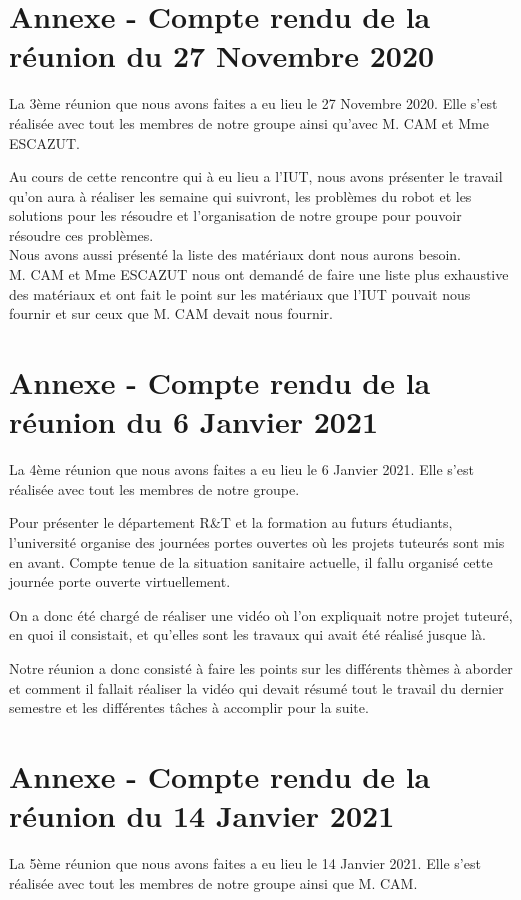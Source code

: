\documentclass{PackagerQualityN}
\begin{document}
\newp
\section*{Annexe - Compte rendu de la réunion du 27 Novembre 2020}
La 3ème réunion que nous avons faites a eu lieu le 27 Novembre 2020. Elle s'est réalisée avec tout les membres de notre groupe ainsi qu'avec M. CAM et Mme ESCAZUT.

Au cours de cette rencontre qui à eu lieu a l'IUT, nous avons présenter le travail qu'on aura à réaliser les semaine qui suivront, les problèmes du robot et les solutions pour les résoudre et l'organisation de notre groupe pour pouvoir résoudre ces problèmes.
\\

Nous avons aussi présenté la liste des matériaux dont nous aurons besoin.
\\

M. CAM et Mme ESCAZUT nous ont demandé de faire une liste plus exhaustive des matériaux et ont fait le point sur les matériaux que l'IUT pouvait nous fournir et sur ceux que M. CAM devait nous fournir.


\newp
\section*{Annexe - Compte rendu de la réunion du 6 Janvier 2021}
La 4ème réunion que nous avons faites a eu lieu le 6 Janvier 2021. Elle s'est réalisée avec tout les membres de notre groupe.

Pour présenter le département R\&T et la formation au futurs étudiants, l'université organise des journées portes ouvertes où les projets tuteurés sont mis en avant. Compte tenue de la situation sanitaire actuelle, il fallu organisé cette journée porte ouverte virtuellement.

On a donc été chargé de réaliser une vidéo où l'on expliquait notre projet tuteuré, en quoi il consistait, et qu'elles sont les travaux qui avait été réalisé jusque là.

Notre réunion a donc consisté à faire les points sur les différents thèmes à aborder et comment il fallait réaliser la vidéo qui devait résumé tout le travail du dernier semestre et les différentes tâches à accomplir pour la suite.


\newp
\section*{Annexe - Compte rendu de la réunion du 14 Janvier 2021}
La 5ème réunion que nous avons faites a eu lieu le 14 Janvier 2021. Elle s'est réalisée avec tout les membres de notre groupe ainsi que M. CAM.
\end{document}
